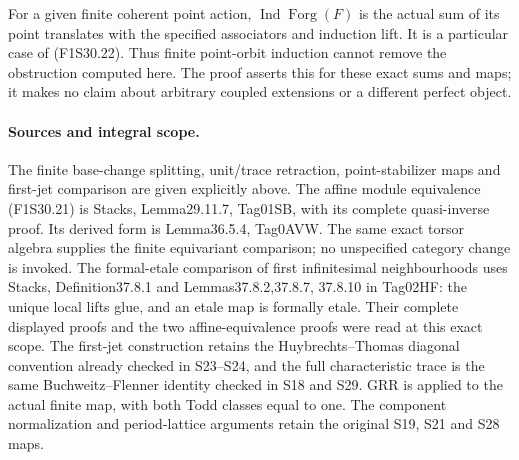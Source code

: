 For a given finite coherent point action,
$\operatorname{Ind}\operatorname{Forg}(F)$ is
the actual sum of its point translates with
the specified associators and induction lift.
It is a particular case of (F1S30.22). Thus
finite point-orbit induction cannot remove
the obstruction computed here. The proof
asserts this for these exact sums and maps;
it makes no claim about arbitrary coupled
extensions or a different perfect object.

\paragraph{Sources and integral scope.}
The finite base-change splitting, unit/trace
retraction, point-stabilizer maps and first-jet
comparison are given explicitly above.
The affine module equivalence (F1S30.21) is
Stacks, Lemma29.11.7, Tag01SB, with its complete
quasi-inverse proof. Its derived form is
Lemma36.5.4, Tag0AVW. The same exact torsor
algebra supplies the finite equivariant
comparison; no unspecified category change
is invoked.
The formal-etale comparison of first
infinitesimal neighbourhoods uses Stacks,
Definition37.8.1 and Lemmas37.8.2,37.8.7,
37.8.10 in Tag02HF: the unique local lifts
glue, and an etale map is formally etale.
Their complete displayed proofs and the
two affine-equivalence proofs were read
at this exact scope.
The first-jet construction retains the
Huybrechts--Thomas diagonal convention already
checked in S23--S24, and the full characteristic
trace is the same Buchweitz--Flenner identity
checked in S18 and S29. GRR is applied to
the actual finite map, with both Todd classes
equal to one. The component normalization
and period-lattice arguments retain the
original S19, S21 and S28 maps.

